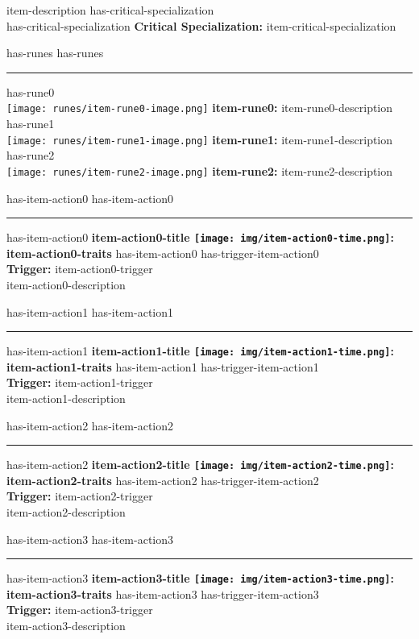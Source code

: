 \documentclass{article}
\begin{document}
        item-description
        has-critical-specialization \\
        has-critical-specialization \textbf{Critical Specialization:} item-critical-specialization

        has-runes \vspace{1.25mm}
        has-runes \rule{\textwidth}{0.5pt}
        has-rune0 \\ \texttt{[image: runes/item-rune0-image.png]} \textbf{item-rune0:} item-rune0-description
        has-rune1 \\ \texttt{[image: runes/item-rune1-image.png]} \textbf{item-rune1:} item-rune1-description
        has-rune2 \\ \texttt{[image: runes/item-rune2-image.png]} \textbf{item-rune2:} item-rune2-description
        
        has-item-action0 \vspace{1.25mm}
        has-item-action0 \rule{\textwidth}{0.5pt}
        has-item-action0 \textbf{item-action0-title \texttt{[image: img/item-action0-time.png]}: item-action0-traits}  
        has-item-action0 has-trigger-item-action0 \\ \textbf{Trigger:} item-action0-trigger\\
        item-action0-description

        has-item-action1 \vspace{1.25mm}
        has-item-action1 \rule{\textwidth}{0.5pt}
        has-item-action1 \textbf{item-action1-title \texttt{[image: img/item-action1-time.png]}: item-action1-traits}  
        has-item-action1 has-trigger-item-action1 \\ \textbf{Trigger:} item-action1-trigger\\
        item-action1-description

        has-item-action2 \vspace{1.25mm}
        has-item-action2 \rule{\textwidth}{0.5pt}
        has-item-action2 \textbf{item-action2-title \texttt{[image: img/item-action2-time.png]}: item-action2-traits}  
        has-item-action2 has-trigger-item-action2 \\ \textbf{Trigger:} item-action2-trigger\\
        item-action2-description

        has-item-action3 \vspace{1.25mm}
        has-item-action3 \rule{\textwidth}{0.5pt}
        has-item-action3 \textbf{item-action3-title \texttt{[image: img/item-action3-time.png]}: item-action3-traits}  
        has-item-action3 has-trigger-item-action3 \\ \textbf{Trigger:} item-action3-trigger\\
        item-action3-description
\end{document}
